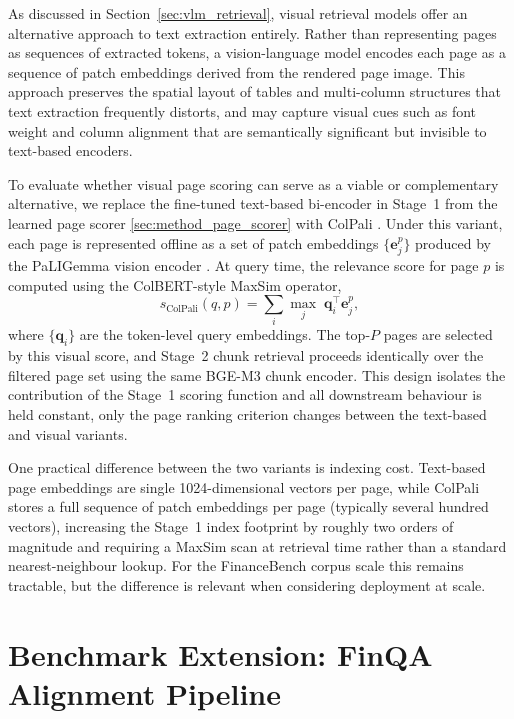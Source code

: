 \documentclass[12pt,twoside,maitrise]{dms}
\theoremstyle{definition}
\numberwithin{equation}{section}
\numberwithin{table}{chapter}
\numberwithin{figure}{chapter}
\begin{document}
As discussed in Section~\ref{sec:vlm_retrieval}, visual retrieval models offer an
alternative approach to text extraction entirely.
Rather than representing pages as sequences of extracted tokens, a vision-language model
encodes each page as a sequence of patch embeddings derived from the rendered page image.
This approach preserves the spatial layout of tables and multi-column structures that
text extraction frequently distorts, and may capture visual cues such as font weight
and column alignment that are semantically significant but invisible to text-based
encoders.

To evaluate whether visual page scoring can serve as a viable or complementary
alternative, we replace the fine-tuned text-based bi-encoder in Stage~1 from the learned page scorer \ref{sec:method_page_scorer} with ColPali
\citep{faysse2024colpali}. Under this variant, each page is represented offline as a set
of patch embeddings $\{\mathbf{e}^p_j\}$ produced by the PaLIGemma vision encoder \citep{beyer2024paligemma}. At
query time, the relevance score for page $p$ is computed using the ColBERT-style MaxSim
operator,
\begin{equation}
  s_{\text{ColPali}}(q, p) = \sum_{i} \max_{j}\; \mathbf{q}_i^\top \mathbf{e}^p_j,
  \label{eq:colpali}
\end{equation}
where $\{\mathbf{q}_i\}$ are the token-level query embeddings. The top-$P$ pages are
selected by this visual score, and Stage~2 chunk retrieval proceeds identically over the
filtered page set using the same BGE-M3 chunk encoder. This design isolates the
contribution of the Stage~1 scoring function and all downstream behaviour is held constant, only the page ranking criterion changes between the text-based and visual variants.

One practical difference between the two variants is indexing cost. Text-based page
embeddings are single 1024-dimensional vectors per page, while ColPali stores a full
sequence of patch embeddings per page (typically several hundred vectors), increasing
the Stage~1 index footprint by roughly two orders of magnitude and requiring a MaxSim
scan at retrieval time rather than a standard nearest-neighbour lookup. For the
FinanceBench corpus scale this remains tractable, but the difference is relevant when
considering deployment at scale.


\section{Benchmark Extension: FinQA Alignment Pipeline}
\label{sec:method_benchmark}
\end{document}

